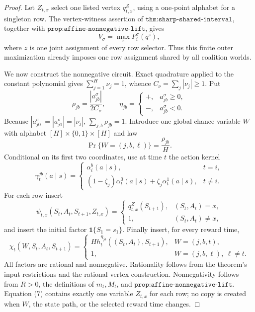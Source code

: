 \documentclass{article}
\begin{document}
\begin{proof}
Let \(Z_{t,x}\) select one listed vertex \(q^Z_{t,x}\), using a one-point alphabet for a singleton row.  The vertex-witness assertion of \(\texttt{thm:sharp-shared-interval}\), together with \(\texttt{prop:affine-nonnegative-lift}\), gives
\[
 V_\sigma=\max_z F_i^\sigma(q^z),
 \tag{3}
\]
where \(z\) is one joint assignment of every row selector.  Thus this finite outer maximization already imposes one row assignment shared by all coalition worlds.

We now construct the nonnegative circuit.  Exact quadrature applied to the constant polynomial gives \(\sum_{j=1}^H\nu_j=1\), whence \(C_\nu=\sum_j|\nu_j|\ge1\).  Put
\[
 \rho_{jb}=\frac{|a_{jb}^\sigma|}{2C_\nu},
 \qquad
 \eta_{jb}=\begin{cases}+,&a_{jb}^\sigma\ge0,\\-,&a_{jb}^\sigma<0.\end{cases}
 \tag{4}
\]
Because \(|a_{j0}^\sigma|=|a_{j1}^\sigma|=|\nu_j|\), \(\sum_{j,b}\rho_{jb}=1\).  Introduce one global chance variable \(W\) with alphabet \([H]\times\{0,1\}\times[H]\) and law
\[
 \Pr\{W=(j,b,\ell)\}=\frac{\rho_{jb}}{H}.
 \tag{5}
\]
Conditional on its first two coordinates, use at time \(t\) the action kernel
\[
 \gamma_t^{jb}(a\mid s)=
 \begin{cases}
  \alpha_i^b(a\mid s),&t=i,\\
  (1-\zeta_j)\alpha_t^0(a\mid s)+\zeta_j\alpha_t^1(a\mid s),&t\ne i.
 \end{cases}
 \tag{6}
\]
For each row insert
\[
 \psi_{t,x}(S_t,A_t,S_{t+1},Z_{t,x})=
 \begin{cases}
 q^{Z}_{t,x}(S_{t+1}),&(S_t,A_t)=x,\\
 1,&(S_t,A_t)\ne x,
 \end{cases}
 \tag{7}
\]
and insert the initial factor \(\mathbf 1\{S_1=s_1\}\).  Finally insert, for every reward time,
\[
 \chi_t(W,S_t,A_t,S_{t+1})=
 \begin{cases}
 Hh_t^{\eta_{jb}}((S_t,A_t),S_{t+1}),&W=(j,b,t),\\
 1,&W=(j,b,\ell),\ \ell\ne t.
 \end{cases}
 \tag{8}
\]
All factors are rational and nonnegative.  Rationality follows from the theorem's input restrictions and the rational vertex construction.  Nonnegativity follows from \(R>0\), the definitions of \(m_t,M_t\), and \(\texttt{prop:affine-nonnegative-lift}\).  Equation (7) contains exactly one variable \(Z_{t,x}\) for each row; no copy is created when \(W\), the state path, or the selected reward time changes.


\end{proof}
\end{document}
